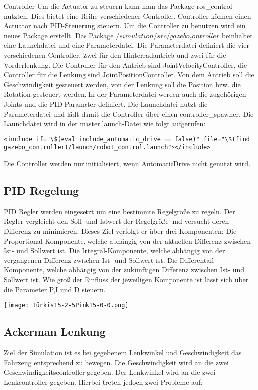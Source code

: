 Controller
Um die Actuator zu steuern kann man das Package ros\_control nutzten.
Dies bietet eine Reihe verschiedener Controller.
Controller können einen Actuator nach PID-Steuerung steuern.
Um die Controller zu benutzen wird ein neues Package erstellt.
Das Package $/simulation/src/gazebo_controller$ beinhaltet eine Launchdatei und eine Parameterdatei.
Die Parameterdatei definiert die vier verschiedenen Controller.
Zwei für den Hinterradantrieb und zwei für die Vorderlenkung.
Die Controller für den Antrieb sind JointVelocityController, die Controller für die Lenkung sind JointPositionController.
Von dem Antrieb soll die Geschwindigkeit gesteuert werden, von der Lenkung soll die Position bzw. die Rotation gesteuert werden.
In der Parameterdatei werden auch die zugehörigen Joints und die PID Parameter definiert.
Die Launchdatei nutzt die Parameterdatei und lädt damit die Controller über einen controller\_spawner.
Die Launchdatei wird in der master.launch-Datei wie folgt aufgerufen:
\begin{lstlisting}
<include if="\$(eval include_automatic_drive == false)" file="\$(find gazebo_controller)/launch/robot_control.launch"></include>
\end{lstlisting}
Die Controller werden nur initialisiert, wenn AutomaticDrive nicht genutzt wird.

\subsection{PID Regelung}
PID Regler werden eingesetzt um eine bestimmte Regelgröße zu regeln. 
Der Regler vergleicht den Soll- und Istwert der Regelgröße und versucht deren Differenz zu minimieren.
Dieses Ziel verfolgt er über drei Komponenten: 
Die Proportional-Komponente, welche abhängig von der aktuellen Differenz zwischen Ist- und Sollwert ist.
Die Integral-Komponente, welche abhängig von der vergangenen Differenz zwischen Ist- und Sollwert ist.
Die Differentail-Komponente, welche abhängig von der zukünftigen Differenz zwischen Ist- und Sollwert ist.
Wie groß der Einfluss der jeweiligen Komponente ist lässt sich über die Parameter P,I und D steuern.
\cite{PIDRegler:2020}

\begin{center}
    \texttt{[image: Türkis15-2-5Pink15-0-0.png]}
\end{center}

\subsection{Ackerman Lenkung}
Ziel der Simulation ist es bei gegebenem Lenkwinkel und Geschwindigkeit das Fahrzeug entsprechend zu bewegen.
Die Geschwindigkeit wird an die zwei Geschwindigkeitscontroller gegeben.
Der Lenkwinkel wird an die zwei Lenkcontroller gegeben.
Hierbei treten jedoch zwei Probleme auf:

